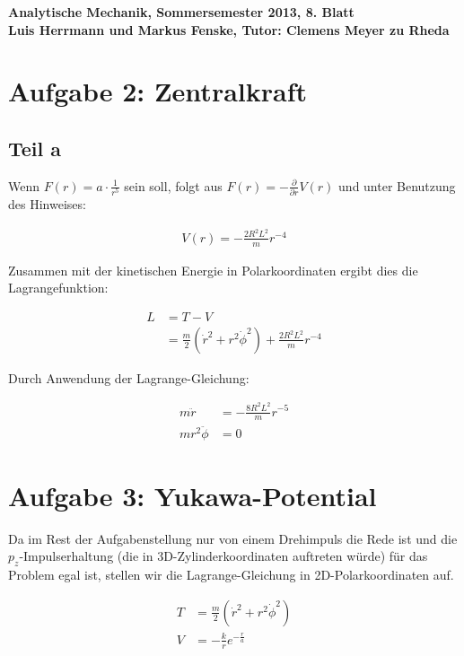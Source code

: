\documentclass[a4paper,german,12pt,smallheadings]{scrartcl}
\begin{document}
\begin{center}
\bfseries %
\sffamily %
\vspace{-40pt}
Analytische Mechanik, Sommersemester 2013, 8. Blatt \\
Luis Herrmann und Markus Fenske, Tutor: Clemens Meyer zu Rheda
\vspace{-10pt}
\end{center}
\section*{Aufgabe 2: Zentralkraft}
\subsection*{Teil a}
Wenn $F(r) = a \cdot \frac{1}{r^5}$ sein soll, folgt aus $F(r) =
-\frac{\partial}{\partial r} V(r)$ und unter Benutzung des Hinweises:

\begin{align*}
  V(r) = - \frac{2R^2L^2}{m} r^{-4}
\end{align*}

Zusammen mit der kinetischen Energie in Polarkoordinaten ergibt dies die
Lagrangefunktion:

\begin{align*}
  L &= T - V \\
    &= \frac{m}{2}(\dot{r}^2 + r^2\dot{\phi}^2) + \frac{2R^2L^2}{m} r^{-4}
\end{align*}

Durch Anwendung der Lagrange-Gleichung:

\begin{align*}
  m\ddot{r} &= -\frac{8R^2L^2}{m}r^{-5} \\
  mr^2\ddot{\phi} &= 0
\end{align*}


\section*{Aufgabe 3: Yukawa-Potential}

Da im Rest der Aufgabenstellung nur von einem Drehimpuls die Rede ist und die
$p_z$-Impulserhaltung (die in 3D-Zylinderkoordinaten auftreten würde) für das
Problem egal ist, stellen wir die Lagrange-Gleichung in 2D-Polarkoordinaten
auf.

\begin{align*}
  T &= \frac{m}{2} \left(\dot{r}^2 + r^2\dot{\phi}^2\right) \\
  V &= -\frac{k}{r} e^{-\frac{r}{a}}
\end{align*}
\end{document}
